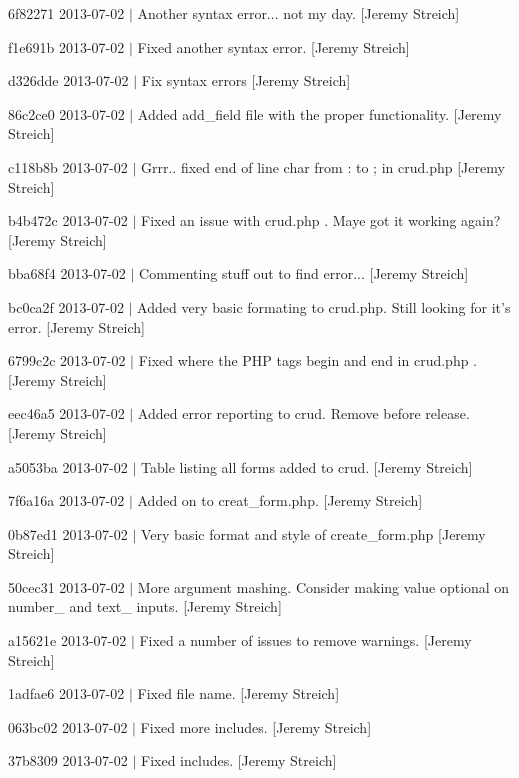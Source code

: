 \begin{DoxyItemize}
\item 6f82271 2013-\/07-\/02 $|$ Another syntax error... not my day. \mbox{[}Jeremy Streich\mbox{]}
\item f1e691b 2013-\/07-\/02 $|$ Fixed another syntax error. \mbox{[}Jeremy Streich\mbox{]}
\item d326dde 2013-\/07-\/02 $|$ Fix syntax errors \mbox{[}Jeremy Streich\mbox{]}
\item 86c2ce0 2013-\/07-\/02 $|$ Added add\-\_\-field file with the proper functionality. \mbox{[}Jeremy Streich\mbox{]}
\item c118b8b 2013-\/07-\/02 $|$ Grrr.. fixed end of line char from \-: to ; in crud.\-php \mbox{[}Jeremy Streich\mbox{]}
\item b4b472c 2013-\/07-\/02 $|$ Fixed an issue with crud.\-php . Maye got it working again? \mbox{[}Jeremy Streich\mbox{]}
\item bba68f4 2013-\/07-\/02 $|$ Commenting stuff out to find error... \mbox{[}Jeremy Streich\mbox{]}
\item bc0ca2f 2013-\/07-\/02 $|$ Added very basic formating to crud.\-php. Still looking for it's error. \mbox{[}Jeremy Streich\mbox{]}
\item 6799c2c 2013-\/07-\/02 $|$ Fixed where the P\-H\-P tags begin and end in crud.\-php . \mbox{[}Jeremy Streich\mbox{]}
\item eec46a5 2013-\/07-\/02 $|$ Added error reporting to crud. Remove before release. \mbox{[}Jeremy Streich\mbox{]}
\item a5053ba 2013-\/07-\/02 $|$ Table listing all forms added to crud. \mbox{[}Jeremy Streich\mbox{]}
\item 7f6a16a 2013-\/07-\/02 $|$ Added on to creat\-\_\-form.\-php. \mbox{[}Jeremy Streich\mbox{]}
\item 0b87ed1 2013-\/07-\/02 $|$ Very basic format and style of create\-\_\-form.\-php \mbox{[}Jeremy Streich\mbox{]}
\item 50cec31 2013-\/07-\/02 $|$ More argument mashing. Consider making value optional on number\-\_\- and text\-\_\- inputs. \mbox{[}Jeremy Streich\mbox{]}
\item a15621e 2013-\/07-\/02 $|$ Fixed a number of issues to remove warnings. \mbox{[}Jeremy Streich\mbox{]}
\item 1adfae6 2013-\/07-\/02 $|$ Fixed file name. \mbox{[}Jeremy Streich\mbox{]}
\item 063bc02 2013-\/07-\/02 $|$ Fixed more includes. \mbox{[}Jeremy Streich\mbox{]}
\item 37b8309 2013-\/07-\/02 $|$ Fixed includes. \mbox{[}Jeremy Streich\mbox{]}

\end{DoxyItemize}
